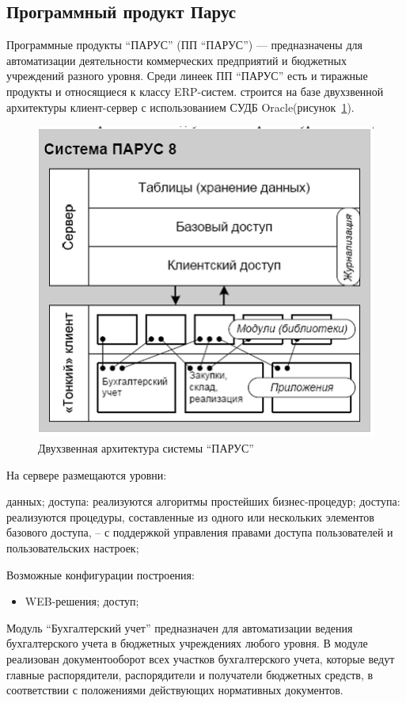 \documentclass[14pt,a4paper]{reportmod}
\begin{document}
\subsection{Программный продукт Парус}
Программные продукты ``ПАРУС'' (ПП ``ПАРУС'') — предназначены для автоматизации деятельности коммерческих предприятий и бюджетных учреждений разного уровня. Среди линеек ПП ``ПАРУС'' есть и тиражные продукты и относящиеся к классу ERP-систем.
 строится на базе двухзвенной архитектуры клиент-сервер с использованием СУДБ Oracle(рисунок~\ref{pic:parus_pic1}).
\begin{figure}
  \centering
  \includegraphics[scale=0.7]{pics/parus_img1}
  \caption{Двухзвенная архитектура системы ``ПАРУС''}
  \label{pic:parus_pic1}
\end{figure}
На сервере размещаются уровни:
\begin{itemize}
 данных;
 доступа: реализуются алгоритмы простейших бизнес-процедур;
 доступа: реализуются процедуры, составленные из одного или нескольких элементов базового доступа, – с поддержкой управления правами доступа пользователей и пользовательских настроек;
\end{itemize}
Возможные конфигурации построения:
\begin{itemize}
  ;
   сеть;
  \item WEB-решения;
   доступ;
\end{itemize}
Модуль ``Бухгалтерский учет'' предназначен для автоматизации ведения бухгалтерского учета в бюджетных учреждениях любого уровня. В модуле реализован документооборот всех участков бухгалтерского учета, которые ведут главные распорядители, распорядители и получатели бюджетных средств, в соответствии с положениями действующих нормативных документов.
\end{document}
